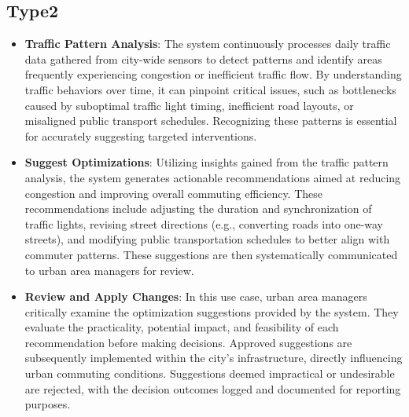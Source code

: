 \documentclass[a4paper,12pt]{article}
\begin{document}
\subsection*{Type2}
\begin{itemize}
    \item \textbf{Traffic Pattern Analysis}: The system continuously processes daily traffic data gathered from city-wide sensors to detect patterns and identify areas frequently experiencing congestion or inefficient traffic flow. By understanding traffic behaviors over time, it can pinpoint critical issues, such as bottlenecks caused by suboptimal traffic light timing, inefficient road layouts, or misaligned public transport schedules. Recognizing these patterns is essential for accurately suggesting targeted interventions.
    \item \textbf{Suggest Optimizations}: Utilizing insights gained from the traffic pattern analysis, the system generates actionable recommendations aimed at reducing congestion and improving overall commuting efficiency. These recommendations include adjusting the duration and synchronization of traffic lights, revising street directions (e.g., converting roads into one-way streets), and modifying public transportation schedules to better align with commuter patterns. These suggestions are then systematically communicated to urban area managers for review.
    \item \textbf{Review and Apply Changes}: In this use case, urban area managers critically examine the optimization suggestions provided by the system. They evaluate the practicality, potential impact, and feasibility of each recommendation before making decisions. Approved suggestions are subsequently implemented within the city’s infrastructure, directly influencing urban commuting conditions. Suggestions deemed impractical or undesirable are rejected, with the decision outcomes logged and documented for reporting purposes.
\end{itemize}

\newpage
\end{document}
